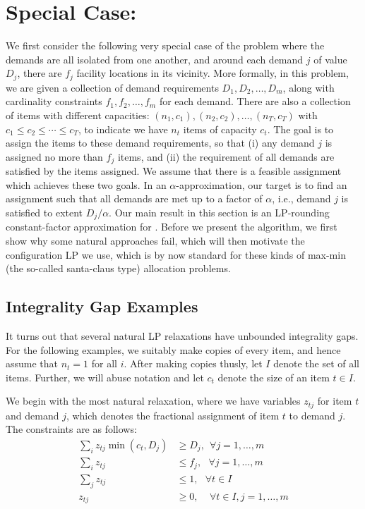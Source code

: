 \newcommand{\barcalS}{\bar{\cal S}\xspace}

\section{Special Case: \cckp}
We first consider the following very special case of the \mckc problem where the demands are all isolated from one another, and around each demand $j$ of value $D_j$, there are $f_j$ facility locations in its vicinity. More formally, in this problem, we are given a collection of demand requirements $D_1, D_2, \ldots, D_m$, along with cardinality constraints $f_1, f_2, \ldots, f_m$ for each demand. There are also a collection of items with different capacities: $(n_1,c_1), (n_2,c_2),\ldots, (n_T,c_T)$ with $c_1 \leq c_2 \le \cdots \le c_T$,
to indicate we have $n_t$ items of capacity $c_t$. The goal is to assign the items to these demand requirements, so that (i) any demand $j$ is assigned no more than $f_j$ items, and (ii) the requirement of all demands are satisfied by the items assigned. We assume that there is a feasible assignment which achieves these two goals. In an $\alpha$-approximation, our target is to find an assignment such that all demands are met up to a factor of $\alpha$, i.e., demand $j$ is satisfied to extent $D_j/\alpha$.
Our main result in this section is an LP-rounding constant-factor approximation for \cckp. Before we present the algorithm, we first show why some natural approaches fail, which will then motivate the configuration LP we use, which is by now standard for these kinds of max-min (the so-called santa-claus type) allocation problems.

\subsection{Integrality Gap Examples}
It turns out that several natural LP relaxations have unbounded integrality gaps. For the following examples, we suitably make copies of every item, and hence assume that $n_t = 1$ for all $i$. After making copies thusly, let $I$ denote the set of all items. Further, we will abuse notation and let $c_t$ denote the
size of an item $t \in I$.

We begin with the most natural relaxation, where we have variables $z_{tj}$ for item $t$ and demand $j$, which denotes the fractional assignment of item $t$ to demand $j$. The constraints are as follows:
\begin{align*}
\sum_{i} z_{tj} \min(c_t, D_j) & \geq D_j, \ \  \forall j=1, \ldots, m \\
\sum_i z_{tj} & \leq f_j, \ \ \ \forall j = 1, \ldots, m \\
\sum_j z_{tj} & \leq 1,  \ \ \ \forall t \in I \\
z_{tj} & \geq 0, \ \ \ \ \ \forall t \in I, j = 1, \ldots, m
\end{align*}

